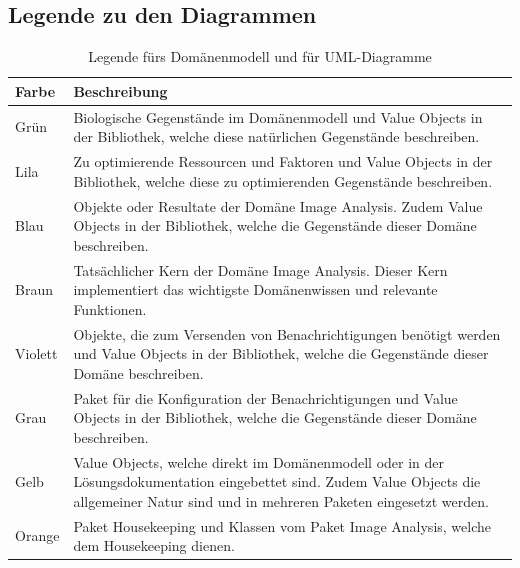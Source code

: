 \subsection{Legende zu den Diagrammen}
\begin{table}[H]
	\centering	
	
	\begin{tabular}{ p{2cm}  p{12cm}  }
		
		\toprule[1pt]
		\rowcolor{maroon!30}	
		Farbe & Beschreibung \\
		
		\midrule
Grün \cellcolor[RGB]{204,235,197}&  Biologische Gegenstände im Domänenmodell und Value Objects in der Bibliothek, welche diese natürlichen Gegenstände beschreiben. \\
Lila \cellcolor[RGB]{253,218,236} & Zu optimierende Ressourcen und Faktoren und Value Objects in der Bibliothek,  welche diese zu optimierenden Gegenstände beschreiben.\\
Blau\cellcolor[RGB]{179,205,227} &  Objekte oder Resultate der Domäne \flqq{}Image Analysis\frqq{}. Zudem Value Objects in der Bibliothek, welche die Gegenstände dieser Domäne beschreiben. \\
Braun \cellcolor[RGB]{229,216,189}& Tatsächlicher Kern der Domäne \flqq{}Image Analysis\frqq{}. Dieser Kern implementiert das wichtigste Domänenwissen und relevante Funktionen.\\			
Violett \cellcolor[RGB]{222,203,228} & Objekte, die zum Versenden von Benachrichtigungen benötigt werden und Value Objects in der Bibliothek, welche die Gegenstände dieser Domäne beschreiben.\\
Grau\cellcolor[RGB]{242,242,242} &  Paket für die Konfiguration der Benachrichtigungen und Value Objects in der Bibliothek, welche die Gegenstände dieser Domäne beschreiben.\\		
Gelb \cellcolor[RGB]{255,255,204}& Value Objects, welche direkt im Domänenmodell oder in der Lösungsdokumentation eingebettet sind. Zudem Value Objects die allgemeiner Natur sind und in mehreren Paketen eingesetzt werden. \\		
Orange \cellcolor[RGB]{254,217,166} &  Paket \glqq{}Housekeeping\grqq{} und Klassen vom Paket \glqq{}Image Analysis\grqq{}, welche dem Housekeeping dienen. \\
		
		\bottomrule
		
	\end{tabular}
	\caption{Legende fürs Domänenmodell und für UML-Diagramme}
	\label{tab: Legende fürs Domänenmodell und für die UML-Diagramme als Lösungsdokumentation}
\end{table}


